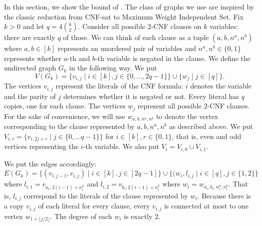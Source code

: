 \documentclass[11pt,a4paper]{article}
\begin{document}
In this section, we show the bound of . The class of graphs we use are inspired by the classic reduction from CNF-sat to Maximum Weight Independent Set.
Fix $k > 0$ and let $q = 4\binom{k}{2}$. Consider all possible 2-CNF clauses on $k$ variables: there are exactly $q$ of those. We can think of each clause as a tuple $(a, b, n^a, n^b)$ where $a, b \in [k]$ represents an unordered pair of variables and $n^a, n^b \in \{0, 1\}$ represents whether $a$-th and $b$-th variable is negated in the clause. We define the undirected graph $G_k$ in the following way. We put
\begin{equation*}
    V(G_k) = \{v_{i,j} \mid i \in [k], j \in \{0, \dots, 2q - 1\}\} \cup
             \{ w_j \mid j \in [q] \}.
\end{equation*}
The vertices $v_{i,j}$ represent the literals of the CNF formula: $i$ denotes the variable and the parity of $j$ determines whether it is negated or not.
Every literal has $q$ copies, one for each clause. The vertices $w_j$ represent all possible 2-CNF clauses. For the sake of convenience, we will use $w_{a,b,n^a,n^b}$ to denote the vertex corresponding to the clause represented by $a,b,n^a,n^b$ as described above. We put $V_{i,r} = \{ v_{i, 2j + r} \mid j \in \{0, \dots q - 1\} \}$ for $i \in [k], r \in \{0, 1\}$, that is, even and odd vertices representing the $i$-th variable. We also put $V_i = V_{i,0} \cup V_{i,1}$.

We put the edges accordingly:
\begin{equation*}
    E(G_k) = \{ (v_{i,j-1}, v_{i,j}) \mid i \in [k], j \in [2q - 1]\} \cup
             \{ (w_i, l_{i,j} \mid i \in [q], j \in \{1, 2\} \}
\end{equation*}
where $l_{i,1} = v_{a_i, 2(i - 1) + n^a_i}$ and $l_{i,2} = v_{b_i, 2(i - 1) + n^b_i}$ where $w_i = w_{a_i, b_i, n^a_i, n^b_i}$. That is, $l_{i,j}$ correspond to the literals of the clause represented by $w_i$. Because there is a copy $v_{i,j}$ of each literal for every clause, every $v_{i,j}$ is connected at most to one vertex $w_{1 + \lfloor j/2 \rfloor}$. The degree of each $w_i$ is exactly $2$.
\end{document}
